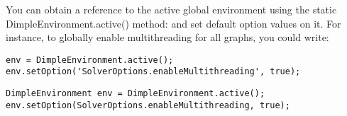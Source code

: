 You can obtain a reference to the active global environment using the static DimpleEnvironment.active() method: and set default option values on it. For instance, to globally enable multithreading for all graphs, you could write:

\ifmatlab
\begin{lstlisting}
env = DimpleEnvironment.active();
env.setOption('SolverOptions.enableMultithreading', true);
\end{lstlisting}
\fi
\ifjava
\begin{lstlisting}
DimpleEnvironment env = DimpleEnvironment.active();
env.setOption(SolverOptions.enableMultithreading, true);
\end{lstlisting}
\fi
